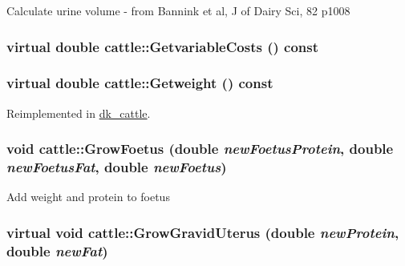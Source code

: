 Calculate urine volume -\/ from Bannink et al, J of Dairy Sci, 82 p1008 \hypertarget{classcattle_ac0d5f90c27a81005db97ff5d58d5607d}{
\subsubsection[{GetvariableCosts}]{\setlength{\rightskip}{0pt plus 5cm}virtual double cattle::GetvariableCosts () const}}
\label{classcattle_ac0d5f90c27a81005db97ff5d58d5607d}
\hypertarget{classcattle_a32f9c2c17b16e891f8e208754865d734}{
\subsubsection[{Getweight}]{\setlength{\rightskip}{0pt plus 5cm}virtual double cattle::Getweight () const}}
\label{classcattle_a32f9c2c17b16e891f8e208754865d734}


Reimplemented in \hyperlink{classdk__cattle_a2c73fdc5a59294459de1a0a193e9ea3a}{dk\_\-cattle}.\hypertarget{classcattle_a19fcd794dfdaba6c37698d04a5056423}{
\subsubsection[{GrowFoetus}]{\setlength{\rightskip}{0pt plus 5cm}void cattle::GrowFoetus (double {\em newFoetusProtein}, \/  double {\em newFoetusFat}, \/  double {\em newFoetus})}}
\label{classcattle_a19fcd794dfdaba6c37698d04a5056423}
Add weight and protein to foetus \hypertarget{classcattle_a4998e90c175bd1e1aa4b57fcfcc5b281}{
\subsubsection[{GrowGravidUterus}]{\setlength{\rightskip}{0pt plus 5cm}virtual void cattle::GrowGravidUterus (double {\em newProtein}, \/  double {\em newFat})}}
\label{classcattle_a4998e90c175bd1e1aa4b57fcfcc5b281}


